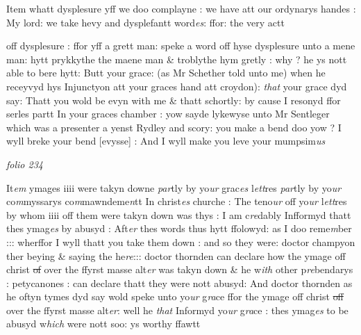 \documentclass[12pt, a4paper]{book}
\begin{document}
			
 		
				\marginpar[\vspace{0.5cm}{\textcolor{Gray}{Sentleger}}]{}
			

		\ifthenelse{\isodd{\thepage}}
		{\reversemarginpar}
		{\normalmarginpar}
		Item whatt dysplesure yff we doo complayne : we have att our ordynarys
handes : My lord: we take hevy and dysplefantt word\textit{es}: ffor: the very actt
			
                     off 
			dysplesure : ffor yff a grett man: speke a word off hyse dysplesure
unto a mene man: hytt prykkythe the maene man \& troblythe hym
 gretly : why ? he ys nott able to bere hytt: Butt your grace: (as Mr Schether
told unto me) when he receyvyd hys Injunctyon att your graces hand
att croydon): \textit{that }your grace dyd say: Thatt you wold be evyn with me
\& thatt schortly: by cause I resonyd ffor serles partt In your graces
	chamber : yow sayde lykewyse 
			unto Mr Sentleger which was a presenter a yenst Rydley
and scory: you make a bend doo yow ? I wyll breke your bend
[evysse] : And I wyll make you leve your mumpsim\textit{us}
                     
               
\dotfill
						\newpage
{}

\textit{folio 234}



		\ifthenelse{\isodd{\thepage}}
		{\reversemarginpar}
		{\normalmarginpar}
		It\textit{em} ymages iiii were takyn downe \textit{par}tly by yo\textit{ur} grac\textit{es} l\textit{ett}res \textit{par}tly by yo\textit{ur} 
co\textit{m}myssarys co\textit{m}mawndeme\textit{n}tt In christ\textit{es} churche : The teno\textit{ur} off yo\textit{ur}
l\textit{ett}res by whom iiii off them were takyn down was thys : I am
c\textit{re}dably Infformyd thatt thes ymag\textit{es} by abusyd : Aft\textit{er} thes words
thus hytt ffolowyd: as I doo reme\textit{m}ber ::: wherffor I wyll thatt
you take them down : and so they were: doctor champyon ther 
beying \& saying the he\textit{re}::: doctor thornden can declare how the 
ymage off christ \sout{of}
               over the ffyrst masse alt\textit{er} was takyn down \&
he w\textit{ith} other p\textit{re}bendarys : petycanones : can declare thatt they were nott
	abusyd: And doctor thornden
			 as he oftyn tymes dyd say wold speke unto
yo\textit{ur} g\textit{ra}ce ffor the ymage off christ \sout{off}
                  over the ffyrst masse alt\textit{er}: well
			 he \textit{that}
Informyd yo\textit{ur} g\textit{ra}ce : thes ymag\textit{es} to be abusyd w\textit{hich} were nott soo: ys worthy
ffawtt
 	
\end{document}
